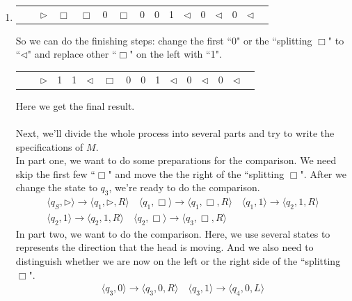\documentclass[12pt,a4paper]{article}
\makeatletter
\newtheorem*{solution}{Solution}
\theoremstyle{definition}
\renewenvironment{solution}[1][Solution] {\par\pushQED{\qed}\normalfont\topsep6\p@\@plus6\p@\relax\trivlist\item[\hskip\labelsep\bfseries#1\@addpunct{.}]\ignorespaces}{\popQED\endtrivlist\@endpefalse} \makeatother
\makeatother
\begin{document}
\begin{enumerate}
\begin{solution}
\begin{enumerate}
	    \begin{center}
		\begin{tabular}{ll|c|c|c|c|c|c|c|c|c|c|c|c|c|c}
			\cline{2-16}
			& & $\triangleright$ &  $\Box$  & $\Box$ & 0 & $\Box$ & 0 & 0 & 1 & $\triangleleft$ & 0  & $\triangleleft$ & 0 & $ \triangleleft$ & \\
			\cline{2-16}
		\end{tabular}
	    \end{center}
	    So we can do the finishing steps: change the first ``0" or the ``splitting $\Box$" to ``$ \triangleleft$" and replace other ``$\Box$" on the left with ``1".
	    \begin{center}
		\begin{tabular}{ll|c|c|c|c|c|c|c|c|c|c|c|c|c|c}
			\cline{2-16}
			& & $\triangleright$ &  1  & 1 & $\triangleleft$ & $\Box$ & 0 & 0 & 1 & $\triangleleft$ & 0  & $\triangleleft$ & 0 & $ \triangleleft$ & \\
			\cline{2-16}
		\end{tabular}
	    \end{center}
	    Here we get the final result.\\
	    ~\\
	    Next, we'll divide the whole process into several parts and try to write the specifications of $M$.\\
	    In part one, we want to do some preparations for the comparison. We need skip the first few ``$\Box$" and move the the right of the ``splitting $\Box$". After we change the state to $q_3$, we're ready to do the comparison.
	    \begin{align*}
	    \langle q_S, \triangleright \rangle \rightarrow \langle q_1, \triangleright,  R\rangle
	    \quad
	    \langle q_1, \Box \rangle \rightarrow \langle q_1, \Box,  R\rangle
	    \quad
	    \langle q_1, 1 \rangle \rightarrow \langle q_2, 1,  R\rangle\\
	    \langle q_2, 1 \rangle \rightarrow \langle q_2, 1,  R\rangle
	    \quad
	    \langle q_2, \Box \rangle \rightarrow \langle q_3, \Box,  R\rangle
	    \end{align*}
	    In part two, we want to do the comparison. Here, we use several states to represents the direction that the head is moving. And we also need to distinguish whether we are now on the left or the right side of the ``splitting $\Box$". 
	    \begin{align*}
	        \langle q_3, 0 \rangle \rightarrow \langle q_3, 0,  R\rangle
	        \quad
	        \langle q_3, 1 \rangle \rightarrow \langle q_4, 0,  L\rangle

\end{align*}
\end{enumerate}
\end{solution}
\end{enumerate}
\end{document}
